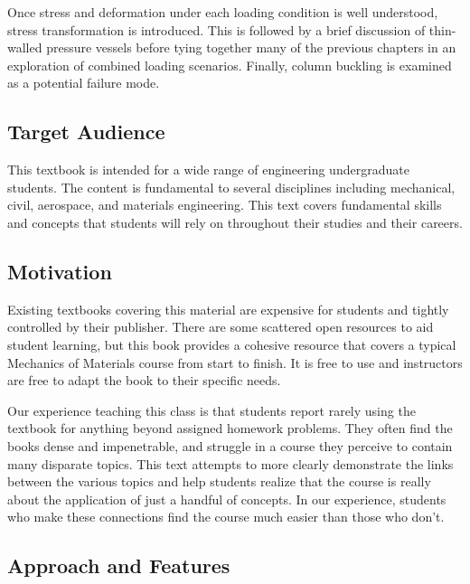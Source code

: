\documentclass[
  letterpaper,
  DIV=11,
  numbers=noendperiod]{scrreprt}
\theoremstyle{definition}
\theoremstyle{remark}
\begin{document}
Once stress and deformation under each loading condition is well
understood, stress transformation is introduced. This is followed by a
brief discussion of thin-walled pressure vessels before tying together
many of the previous chapters in an exploration of combined loading
scenarios. Finally, column buckling is examined as a potential failure
mode.

\subsection*{Target Audience}\label{target-audience}

This textbook is intended for a wide range of engineering undergraduate
students. The content is fundamental to several disciplines including
mechanical, civil, aerospace, and materials engineering. This text
covers fundamental skills and concepts that students will rely on
throughout their studies and their careers.

\subsection*{Motivation}\label{motivation}

Existing textbooks covering this material are expensive for students and
tightly controlled by their publisher. There are some scattered open
resources to aid student learning, but this book provides a cohesive
resource that covers a typical Mechanics of Materials course from start
to finish. It is free to use and instructors are free to adapt the book
to their specific needs.

Our experience teaching this class is that students report rarely using
the textbook for anything beyond assigned homework problems. They often
find the books dense and impenetrable, and struggle in a course they
perceive to contain many disparate topics. This text attempts to more
clearly demonstrate the links between the various topics and help
students realize that the course is really about the application of just
a handful of concepts. In our experience, students who make these
connections find the course much easier than those who don't.

\subsection*{Approach and Features}\label{approach-and-features}
\end{document}
